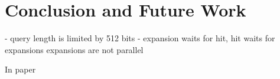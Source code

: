\section{Conclusion and Future Work}
\label{sec:concl}


 - query length is limited by 512 bits
 - expansion waits for hit, hit waits for expansions expansions are not parallel

In paper \cite{vipin2019}